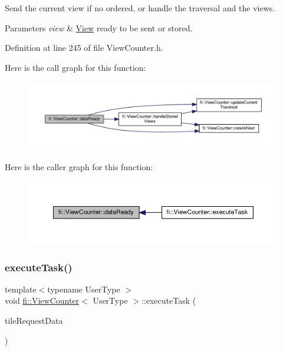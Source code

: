 Send the current view if no ordered, or handle the traversal and the views. 


\begin{DoxyParams}{Parameters}
{\em view} & \hyperlink{classfi_1_1View}{View} ready to be sent or stored. \\
\hline
\end{DoxyParams}


Definition at line 245 of file View\+Counter.\+h.

Here is the call graph for this function\+:
\nopagebreak
\begin{figure}[H]
\begin{center}
\leavevmode
\includegraphics[width=350pt]{df/dae/classfi_1_1ViewCounter_a20e96bdb97f1aecc5bb0a81fb456c0fc_cgraph}
\end{center}
\end{figure}
Here is the caller graph for this function\+:
\nopagebreak
\begin{figure}[H]
\begin{center}
\leavevmode
\includegraphics[width=350pt]{df/dae/classfi_1_1ViewCounter_a20e96bdb97f1aecc5bb0a81fb456c0fc_icgraph}
\end{center}
\end{figure}
\mbox{\label{classfi_1_1ViewCounter_a2c05a287109d15c0e33b6855545db65d}} 
\subsubsection{\texorpdfstring{execute\+Task()}{executeTask()}}
{\footnotesize\ttfamily template$<$typename User\+Type $>$ \\
void \hyperlink{classfi_1_1ViewCounter}{fi\+::\+View\+Counter}$<$ User\+Type $>$\+::execute\+Task (\begin{DoxyParamCaption}\item[{std\+::shared\+\_\+ptr$<$ \hyperlink{classfi_1_1HTGSTileRequestData}{fi\+::\+H\+T\+G\+S\+Tile\+Request\+Data}$<$ User\+Type $>$$>$}]{tile\+Request\+Data }\end{DoxyParamCaption})\hspace{0.3cm}{\ttfamily [inline]}}



